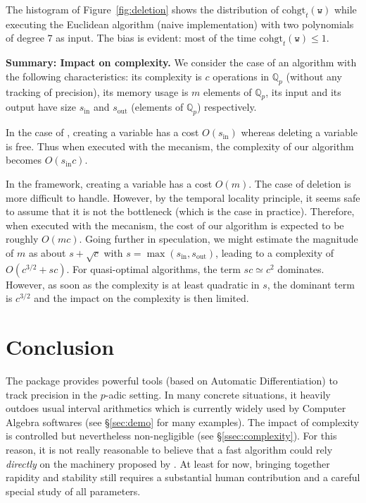 \documentclass[sigconf]{acmart}
\newcommand{\Q}{\mathbb Q}
\newcommand{\Qp}{\Q_p}
\newcommand{\ttw}{\texttt{w}\xspace}
\newcommand{\ZpL}{\text{\color{output} \rm \tt ZpL}\xspace}
\newcommand{\ZpLC}{\text{\color{output} \rm \tt ZpLC}\xspace}
\newcommand{\ZpLF}{\text{\color{output} \rm \tt ZpLF}\xspace}
\newcommand{\cohgt}{\text{cohgt}}
\newcommand{\inp}{\text{in}}
\newcommand{\out}{\text{out}}
\theoremstyle{definition}
\begin{document}
%
The histogram of Figure~\ref{fig:deletion} shows 
the distribution of $\cohgt_t(\ttw)$ while executing the Euclidean
algorithm (naive implementation) with two polynomials of degree $7$
as input. The bias is evident: most of the time $\cohgt_t(\ttw) \leq
1$.

\medskip

\noindent \textbf{Summary: Impact on complexity.}
% 
We consider the case of an algorithm with the following characteristics: 
its complexity is $c$ operations in $\Qp$ (without any tracking of 
precision), its memory usage is $m$ elements of $\Qp$, its input and its 
output have size $s_\inp$ and $s_\out$ (elements of $\Qp$) respectively.

In the case of \ZpLF, creating a variable has a cost $O(s_\inp)$ 
whereas deleting a variable is free. 
Thus when executed with the \ZpLF mecanism, the complexity of our
algorithm becomes $O(s_\inp c)$.

In the \ZpLC framework, creating a variable has a cost $O(m)$. The case 
of deletion is more difficult to handle. However, by the temporal 
locality principle, it seems safe to assume that it is not the 
bottleneck (which is the case in practice). Therefore, when executed 
with the \ZpLF mecanism, the cost of our algorithm is expected to be 
roughly $O(mc)$. Going further in speculation, we might estimate the 
magnitude of $m$ as about $s + \sqrt c$ with $s = \max(s_\inp, 
s_\out)$, leading to a complexity of $O(c^{3/2} + sc)$. For 
quasi-optimal algorithms, the term $sc \simeq c^2$ dominates. However, 
as soon as the complexity is at least quadratic in $s$, the dominant 
term is $c^{3/2}$ and the impact on the complexity is then limited.

\section{Conclusion}

The package \ZpL provides powerful tools (based on Automatic 
Differentiation) to track precision in the $p$-adic setting. In many 
concrete situations, it heavily outdoes usual interval arithmetics 
which is currently widely used by Computer Algebra softwares (see
\S \ref{sec:demo} for many examples).
The impact of complexity is controlled but nevertheless non-negligible 
(see \S \ref{ssec:complexity}). For this reason, it is not really 
reasonable to believe that a fast algorithm could rely \emph{directly} 
on the machinery proposed by \ZpL. At least for now, bringing together 
rapidity and stability still requires a substantial human contribution 
and a careful special study of all parameters.
\end{document}

